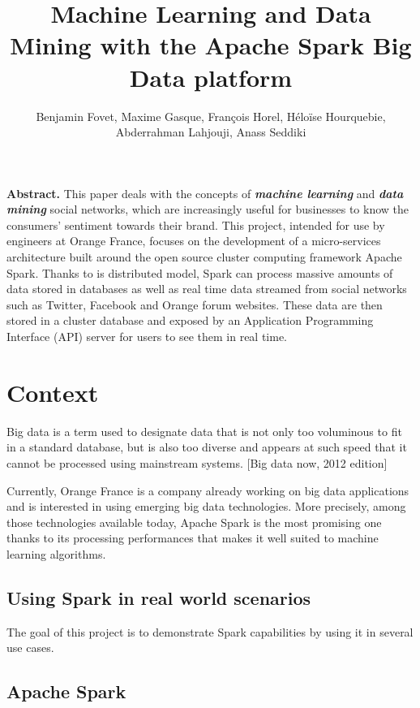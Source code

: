 \documentclass[11pt]{article}
\title{\textbf{Machine Learning and Data Mining with the Apache Spark Big Data platform}}
\author{Benjamin Fovet, Maxime Gasque, François Horel, Héloïse Hourquebie, Abderrahman Lahjouji, Anass Seddiki}
\affil{\texttt{\{bfovet, mgasque, fhorel, hhourquebie, alahjouji, aseddiki\} @enseirb-matmeca.fr}}
\begin{document}
\maketitle

\textbf{Abstract.} This paper deals with the concepts of \textbf{\textit{machine learning}} and \textbf{\textit{data mining}} social networks, which are increasingly useful for businesses to know the consumers' sentiment towards their brand. This project, intended for use by engineers at Orange France, focuses on the development of a micro-services architecture built around the open source cluster computing framework Apache Spark. Thanks to is distributed model, Spark can process massive amounts of data stored in databases as well as real time data streamed from social networks such as Twitter, Facebook and Orange forum websites. These data are then stored in a cluster database and exposed by an Application Programming Interface (API) server for users to see them in real time.


\section{Context}
Big data is a term used to designate data that is not only too voluminous to fit in a standard database, but is also too diverse and appears at such speed that it cannot be processed using mainstream systems. [Big data now, 2012 edition]

Currently, Orange France is a company already working on big data applications and is interested in using emerging big data technologies. More precisely, among those technologies available today, Apache Spark is the most promising one thanks to its processing performances that makes it well suited to machine learning algorithms.

\subsection{Using Spark in real world scenarios}
The goal of this project is to demonstrate Spark capabilities by using it in several use cases.

\subsection{Apache Spark}
\end{document}
